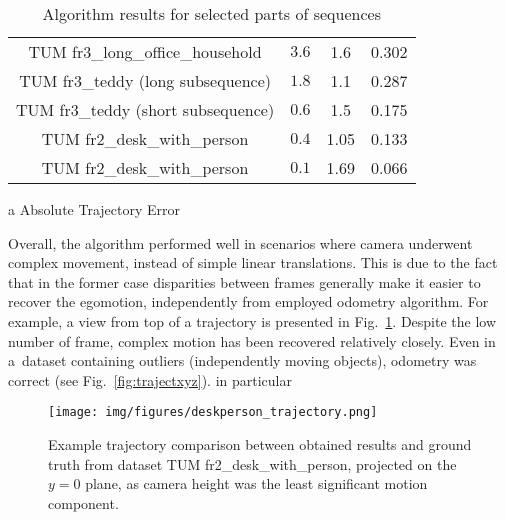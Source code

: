 \begin{table}[ht]
	\centering
	
	\begin{threeparttable}
		\caption{Algorithm results for selected parts of sequences}
		\label{tab:drift}
		
		\begin{tabularx}{0.9\textwidth}{C{0.5} C{0.2} C{0.15} C{0.15}}
			\toprule
			 &  &  & \\
			\midrule
			TUM fr3\_long\_office\_household & $3.6$ & 1.6 &  0.302 \\
			TUM fr3\_teddy (long subsequence) & $1.8$ & 1.1 & 0.287 \\
			TUM fr3\_teddy (short subsequence) & $0.6$ & 1.5 & 0.175 \\
			TUM fr2\_desk\_with\_person & $0.4$ & 1.05 & 0.133 \\
			TUM fr2\_desk\_with\_person & $0.1$ & 1.69 & 0.066 \\
			\bottomrule
		\end{tabularx}
		
		\begin{tablenotes}
			\footnotesize
			\item[a] Absolute Trajectory Error
		\end{tablenotes}
		
	\end{threeparttable}
\end{table}

Overall, the algorithm performed well in scenarios where camera underwent complex movement, instead of simple linear translations. This is due to the fact that in the former case disparities between frames generally make it easier to recover the egomotion, independently from employed odometry algorithm. For example, a view from top of a trajectory is presented in Fig.~\ref{fig:traject}. Despite the low number of frame, complex motion has been recovered relatively closely. Even in a~dataset containing outliers (independently moving objects), odometry was correct (see Fig.~\ref{fig:trajectxyz}).
in particular
\begin{figure}[ht]
	\centering\texttt{[image: img/figures/deskperson\_trajectory.png]}
	\caption{ Example trajectory comparison between obtained results and ground truth from dataset TUM fr2\_desk\_with\_person, projected on the $y=0$ plane, as camera height was the least significant motion component. }
	\label{fig:traject}
\end{figure}

